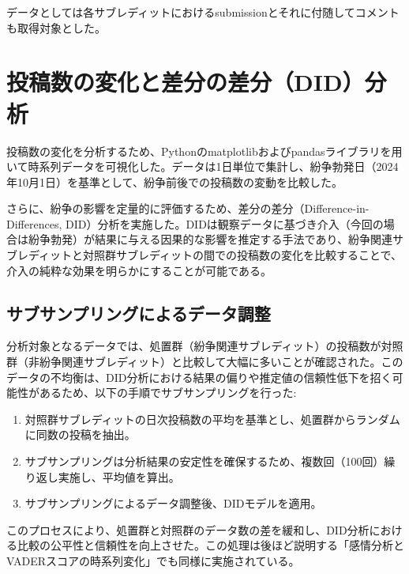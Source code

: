 \documentclass[11pt, a4j]{jreport}
\begin{document}
    データとしては各サブレディットにおけるsubmissionとそれに付随してコメントも取得対象とした。

    \section{投稿数の変化と差分の差分（DID）分析}
    投稿数の変化を分析するため、Pythonのmatplotlibおよびpandasライブラリを用いて時系列データを可視化した。データは1日単位で集計し、紛争勃発日（2024年10月1日）を基準として、紛争前後での投稿数の変動を比較した。

    さらに、紛争の影響を定量的に評価するため、差分の差分（Difference-in-Differences, DID）分析を実施した。DIDは観察データに基づき介入（今回の場合は紛争勃発）が結果に与える因果的な影響を推定する手法であり、紛争関連サブレディットと対照群サブレディットの間での投稿数の変化を比較することで、介入の純粋な効果を明らかにすることが可能である。

    \subsection*{サブサンプリングによるデータ調整}
    分析対象となるデータでは、処置群（紛争関連サブレディット）の投稿数が対照群（非紛争関連サブレディット）と比較して大幅に多いことが確認された。このデータの不均衡は、DID分析における結果の偏りや推定値の信頼性低下を招く可能性があるため、以下の手順でサブサンプリングを行った:

    \begin{enumerate}
        \item 対照群サブレディットの日次投稿数の平均を基準とし、処置群からランダムに同数の投稿を抽出。
        \item サブサンプリングは分析結果の安定性を確保するため、複数回（100回）繰り返し実施し、平均値を算出。
        \item サブサンプリングによるデータ調整後、DIDモデルを適用。
    \end{enumerate}

    このプロセスにより、処置群と対照群のデータ数の差を緩和し、DID分析における比較の公平性と信頼性を向上させた。この処理は後ほど説明する「感情分析とVADERスコアの時系列変化」でも同様に実施されている。
\end{document}
